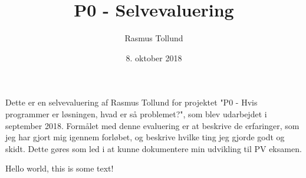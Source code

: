 \documentclass[10pt,a4paper]{article}
\author{Rasmus Tollund}
\title{P0 - Selvevaluering}
\date{8. oktober 2018}
\begin{document}
\maketitle

Dette er en selvevaluering af Rasmus Tollund for projektet "P0 - Hvis programmer er løsningen, hvad er så problemet?", som blev udarbejdet i september 2018. Formålet med denne evaluering er at beskrive de erfaringer, som jeg har gjort mig igennem forløbet, og beskrive hvilke ting jeg gjorde godt og skidt. Dette gøres som led i at kunne dokumentere min udvikling til PV eksamen.

Hello world, this is some text!
\end{document}
